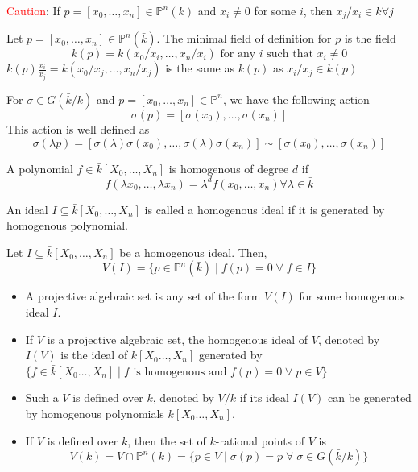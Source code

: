 \documentclass[oneside, 12pt, ]{scrbook}
\theoremstyle{theorem}
\begin{document}
\textcolor{red}{Caution}: If $p = [x_{0},\hdots ,x_{n}] \in \mathbb{P}^n(k)$ and $x_{i} \neq 0$ for some $i$, then $x_{j}/x_{i} \in k \forall j$

\begin{definition}
Let $p = [x_{0},\hdots ,x_{n}] \in \mathbb{P}^n(\bar{k})$. The minimal field of definition for $p$ is the field $$k(p) = k(x_{0}/x_{i},\hdots ,x_{n}/x_{i}) \text{ for any } i \text{ such that } x_{i} \neq 0$$
$k(p) \frac{x_{i}}{x_{j}} = k(x_{0}/x_{j},\hdots ,x_{n}/x_{j})$ is the same as $k(p)$ as $x_{i}/x_{j} \in k(p)$
\end{definition}  

For $\sigma \in G(\bar{k}/k)$ and $p = [x_{0},\hdots ,x_{n}] \in \mathbb{P}^n$, we have the following action $$\sigma(p) = [\sigma(x_{0}),\hdots ,\sigma(x_{n})]$$
This action is well defined as $$\sigma(\lambda p) = [\sigma(\lambda)\sigma(x_{0}),\hdots ,\sigma(\lambda) \sigma(x_{n})] \sim [\sigma(x_{0}),\hdots ,\sigma(x_{n})]$$

\begin{definition}
A polynomial $f \in \bar{k}[X_{0}, \hdots , X_{n}]$ is homogenous of degree $d$ if $$f(\lambda x_{0} , \hdots , \lambda x_{n})  = \lambda^d f(x_{0} , \hdots ,x_{n}) \forall \lambda \in \bar{k}$$
\end{definition}

\begin{definition}
An ideal $I \subseteq \bar{k}[X_{0} , \hdots , X_{n}]$ is called a homogenous ideal if it is generated by homogenous polynomial.  
\end{definition}

\begin{definition}
Let $I \subseteq \bar{k}[X_{0} , \hdots , X_{n}]$ be a homogenous ideal. Then, $$V(I) = \{p \in \mathbb{P}^n (\bar{k}) \mid f(p)=0 \; \forall \; f\in I\}$$
\end{definition}

\begin{definition}
\begin{itemize}
\item A projective algebraic set is any set of the form $V(I)$ for some homogenous ideal $I$. 
\item If $V$ is a projective algebraic set, the homogenous ideal of $V$, denoted by $I(V)$ is the ideal of $\bar{k}[X_{0} \hdots , X_{n}]$ generated by $\{f \in \bar{k}[X_{0} \hdots , X_{n}]\mid f \text{ is homogenous and }f(p)= 0 \; \forall \; p\in V\}$
\item Such a $V$ is defined over $k$, denoted by $V/k$ if its ideal $I(V)$ can be generated by homogenous polynomials $k[X_{0} \hdots , X_{n}]$. 
\item If $V$ is defined over $k$, then the set of $k$-rational points of $V$ is $$V(k) = V \cap \mathbb{P}^{n}(k) = \{p \in V \mid \sigma(p)=p \; \forall \; \sigma \in G(\bar{k}/k)\}$$
\end{itemize}
\end{definition}
\end{document}
